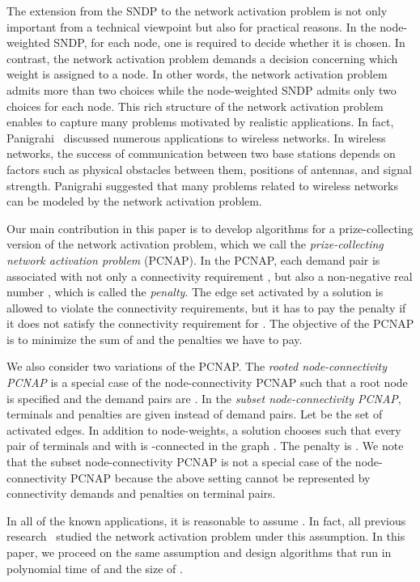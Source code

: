 \documentclass[11pt]{article}
\begin{document}
The extension from the SNDP to the network activation problem is not
only important from a technical viewpoint but also for practical
reasons. In the node-weighted SNDP, for each node, one is required to decide whether it
is chosen.  In contrast, the network activation problem demands
a decision concerning which weight is assigned to a node. In other words, the
network activation problem admits more than two choices while the
node-weighted SNDP admits only two choices for each node.  This rich
structure of the network activation problem enables to capture many
problems motivated by realistic applications.  In fact,
Panigrahi~\cite{Panigrahi11wireless} discussed numerous applications to
wireless networks.  In wireless networks, the success of communication
between two base stations depends on factors such as physical
obstacles between them, positions of antennas, and signal strength.
Panigrahi suggested that many problems related to wireless networks can
be modeled by the network activation problem.

Our main contribution in this paper is to develop algorithms for 
a prize-collecting version of the network activation
problem, which we call the {\em prize-collecting network activation
problem} (PCNAP). 
In the PCNAP,
each demand pair  is associated with not only a
connectivity requirement , but also a non-negative real number
, which is called the \emph{penalty}.
The edge set  activated by a solution  
is allowed to violate the
connectivity requirements,
but it has to pay the penalty  if it does not satisfy the connectivity
requirement for . 
The objective of the PCNAP
is to minimize the sum of 
 and the penalties we have to pay.

We also consider two variations of the PCNAP.
The {\em rooted node-connectivity PCNAP} is a special case of the
node-connectivity PCNAP such that 
a root node  is specified and the demand pairs
are .
In the {\em subset node-connectivity PCNAP},
terminals  
and penalties  are given instead of demand pairs.
Let  be the set of activated edges. 
In addition to node-weights,
a solution chooses  such that 
every pair of terminals  and  
with 
is -connected in the graph .
The penalty is .
We note that the subset node-connectivity PCNAP is not a special case of
the node-connectivity PCNAP because the above setting cannot be represented by 
connectivity demands and penalties on terminal pairs.


In all of the known applications, it is reasonable to assume 
.
In fact, all previous research~\cite{Nutov13activation,Panigrahi11wireless} studied the network activation problem 
under this assumption.
In this paper, we proceed on the same assumption and 
design algorithms
that run in polynomial time of  and the size of .
\end{document}
